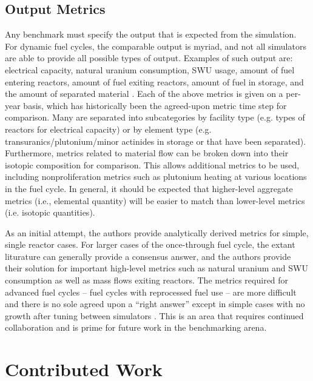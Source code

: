 \documentclass{anstrans}
\begin{document}
\subsection{Output Metrics}
Any benchmark must specify the output that is expected from the simulation. For
dynamic fuel cycles, the comparable output is myriad, and not all simulators are
able to provide all possible types of output. Examples of such output are:
electrical capacity, natural uranium consumption, SWU usage, amount of fuel
entering reactors, amount of fuel exiting reactors, amount of fuel in storage,
and the amount of separated material
\cite{guerin_benchmark_2009,boucher_specification_2008}. Each of the above
metrics is given on a per-year basis, which has historically been the
agreed-upon metric time step for comparison. Many are separated into
subcategories by facility type (e.g. types of reactors for electrical capacity)
or by element type (e.g. transuranics/plutonium/minor actinides in storage or
that have been separated). Furthermore, metrics related to material flow can be
broken down into their isotopic composition for comparison. This allows
additional metrics to be used, including nonproliferation metrics such as
plutonium heating at various locations in the fuel cycle. In general, it should
be expected that higher-level aggregate metrics (i.e., elemental quantity) will be 
easier to match than lower-level metrics (i.e. isotopic quantities).

As an initial attempt, the authors provide analytically derived metrics for simple,
single reactor cases. For larger cases of the once-through fuel cycle, the
extant liturature can generally provide a consensus answer, and the authors
provide their solution for important high-level metrics such as natural uranium
and SWU consumption as well as mass flows exiting reactors. The metrics required
for advanced fuel cycles -- fuel cycles with reprocessed fuel use -- are more
difficult and there is no sole agreed upon a ``right answer'' 
except in simple cases with no growth after tuning
between simulators \cite{guerin_benchmark_2009}. This is an area that requires
continued collaboration and is prime for future work in the benchmarking arena.

\section{Contributed Work}
\end{document}

